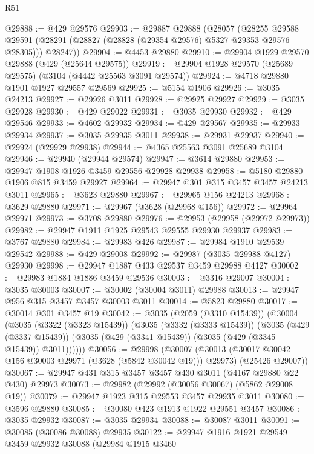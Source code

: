 \begin{lexlean}{R51}
\begin{coremodule}
@29888 := @429 @29576
@29903 := @29887
    @29888
    (@28057
      (@28255
        @29588
        @29591
        (@28291 (@28827 (@28828 (@29354 @29576) @5327 @29353 @29576 @28305)))
        @28247))
@29904 := @4453 @29880
@29910 := @29904 @1929 @29570 @29888 (@429 (@25644 @29575))
@29919 := @29904 @1928 @29570 (@25689 @29575) (@3104 (@4442 @25563 @3091 @29574))
@29924 := @4718 @29880 @1901 @1927 @29557 @29569
@29925 := @5154 @1906
@29926 := @3035 @24213
@29927 := @29926 @3011
@29928 := @29925 @29927
@29929 := @3035 @29928
@29930 := @429 @29022
@29931 := @3035 @29930
@29932 := @429 @29546
@29933 := @4602 @29932
@29934 := @429 @29567
@29935 := @29933 @29934
@29937 := @3035 @29935 @3011
@29938 := @29931 @29937
@29940 := @29924 (@29929 @29938)
@29944 := @4365 @25563 @3091 @25689 @3104
@29946 := @29940 (@29944 @29574)
@29947 := @3614 @29880
@29953 := @29947 @1908 @1926 @3459 @29556 @29928 @29938
@29958 := @5180 @29880 @1906 @815 @3459 @29927
@29964 := @29947 @301 @315 @3457 @3457 @24213 @3011
@29965 := @3623 @29880
@29967 := @29965 @156 @24213
@29968 := @3629 @29880
@29971 := @29967 (@3628 (@29968 @156))
@29972 := @29964 @29971
@29973 := @3708 @29880
@29976 := @29953 (@29958 (@29972 @29973))
@29982 := @29947 @1911 @1925 @29543 @29555 @29930 @29937
@29983 := @3767 @29880
@29984 := @29983 @426
@29987 := @29984 @1910 @29539 @29542
@29988 := @429 @29008
@29992 := @29987 (@3035 @29988 @4127) @29930
@29998 := @29947 @1887 @433 @29537 @3459 @29988 @4127
@30002 := @29983 @1884 @1886 @3459 @29536
@30003 := @3316 @29007
@30004 := @3035 @30003
@30007 := @30002 (@30004 @3011) @29988
@30013 := @29947 @956 @315 @3457 @3457 @30003 @3011
@30014 := @5823 @29880
@30017 := @30014 @301 @3457 @19
@30042 := @3035
    (@2059 (@3310 @15439))
    (@30004
      (@3035
        (@3322 (@3323 @15439))
        (@3035
          (@3332 (@3333 @15439))
          (@3035
            (@429 (@3337 @15439))
            (@3035 (@429 (@3341 @15439)) (@3035 (@429 (@3345 @15439)) @3011))))))
@30056 := @29998
    (@30007
      (@30013 (@30017 @30042 @156 @30003 @29971 (@3628 (@5842 @30042 @19))) @29973)
      (@25426 @29007))
@30067 := @29947 @431 @315 @3457 @3457 @430 @3011 (@4167 @29880 @22 @430) @29973
@30073 := @29982 (@29992 (@30056 @30067) (@5862 @29008 @19))
@30079 := @29947 @1923 @315 @29553 @3457 @29935 @3011
@30080 := @3596 @29880
@30085 := @30080 @423 @1913 @1922 @29551 @3457
@30086 := @3035 @29932
@30087 := @3035 @29934
@30088 := @30087 @3011
@30091 := @30085 (@30086 @30088) @29935
@30122 := @29947
    @1916
    @1921
    @29549
    @3459
    @29932
    @30088
    (@29984
      @1915
      @3460

\end{coremodule}
\end{lexlean}
